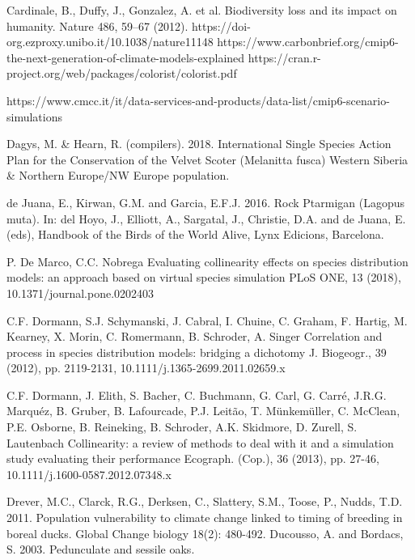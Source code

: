 \documentclass[12pt,a4paper]{article}
\begin{document}
\begin{thebibliography}{999}
Cardinale, B., Duffy, J., Gonzalez, A. et al. Biodiversity loss and its impact on humanity. Nature 486, 59–67 (2012). https://doi-org.ezproxy.unibo.it/10.1038/nature11148
https://www.carbonbrief.org/cmip6-the-next-generation-of-climate-models-explained
https://cran.r-project.org/web/packages/colorist/colorist.pdf

https://www.cmcc.it/it/data-services-and-products/data-list/cmip6-scenario-simulations

Dagys, M. \& Hearn, R. (compilers). 2018. International Single Species Action Plan for the Conservation of the Velvet Scoter (Melanitta fusca) Western Siberia \& Northern Europe/NW Europe population.


de Juana, E., Kirwan, G.M. and Garcia, E.F.J. 2016. Rock Ptarmigan (Lagopus muta). In: del Hoyo, J., Elliott, A., Sargatal, J., Christie, D.A. and de Juana, E. (eds), Handbook of the Birds of the World Alive, Lynx Edicions, Barcelona.


P. De Marco, C.C. Nobrega
Evaluating collinearity effects on species distribution models: an approach based on virtual species simulation
PLoS ONE, 13 (2018), 10.1371/journal.pone.0202403

C.F. Dormann, S.J. Schymanski, J. Cabral, I. Chuine, C. Graham, F. Hartig, M. Kearney, X. Morin, C. Romermann, B. Schroder, A. Singer
Correlation and process in species distribution models: bridging a dichotomy
J. Biogeogr., 39 (2012), pp. 2119-2131, 10.1111/j.1365-2699.2011.02659.x

C.F. Dormann, J. Elith, S. Bacher, C. Buchmann, G. Carl, G. Carré, J.R.G. Marquéz, B. Gruber, B. Lafourcade, P.J. Leitão, T. Münkemüller, C. McClean, P.E. Osborne, B. Reineking, B. Schroder, A.K. Skidmore, D. Zurell, S. Lautenbach
Collinearity: a review of methods to deal with it and a simulation study evaluating their performance
Ecograph. (Cop.), 36 (2013), pp. 27-46, 10.1111/j.1600-0587.2012.07348.x

Drever, M.C., Clarck, R.G., Derksen, C., Slattery, S.M., Toose, P., Nudds, T.D. 2011. Population vulnerability to climate change linked to timing of breeding in boreal ducks. Global Change biology 18(2): 480-492.
Ducousso, A. and Bordacs, S. 2003. Pedunculate and sessile oaks.




\end{thebibliography}
\end{document}
